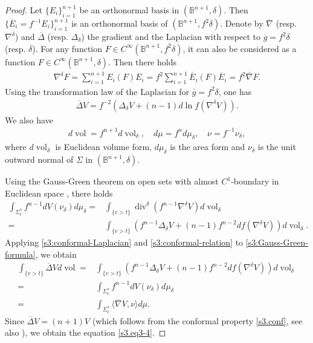 \documentclass[11pt,reqno]{amsart}
\theoremstyle{definition}
\theoremstyle{remark}
\numberwithin{equation}{section}
\renewcommand{\(}{\left(}
\renewcommand{\)}{\right)}
\renewcommand{\~}{\widetilde}
\renewcommand{\-}{\overline}
\renewcommand{\d}{\delta}
\newcommand{\D}{\Delta}
\newcommand{\vol}{\operatorname{vol}}
\newcommand{\divv}{\operatorname{div}}
\begin{document}
\begin{proof}
	Let $\{E_i\}_{i=1}^{n+1}$ be an orthonormal basis in $(\mathbb B^{n+1},\d)$. Then $\{\-E_i=f^{-1}E_i\}_{i=1}^{n+1}$ is an orthonormal basis of $(\mathbb B^{n+1},f^2\d)$. Denote by $\-\nabla$ (resp. $\nabla^\d$) and $\-\D$ (resp. $\D_\d$) the gradient and the Laplacian with respect to $\-g=f^2\d$ (resp. $\d$). For any function $F\in C^\infty(\mathbb B^{n+1},f^2\d)$, it can also be considered as a function $F\in C^\infty(\mathbb B^{n+1},\d)$. Then there holds
	\begin{align*}
	\nabla^\d F=\sum_{i=1}^{n+1}E_i(F)E_i=f^2 \sum_{i=1}^{n+1}\-E_i(F)\-E_i=f^2 \-\nabla F.
	\end{align*}
	Using the transformation law of the Laplacian for $\-g=f^2 \d$, one has
	\begin{align}\label{s3:conformal-Laplacian}
	\-\D V=f^{-2}\(\D_\d V+(n-1)d\ln f(\nabla^\d V)\).
	\end{align}	
	We also have
	\begin{align}\label{s3:conformal-relation}
	d\vol=f^{n+1}d\vol_{\d}, \quad d\mu=f^n d\mu_\d, \quad \nu=f^{-1} \nu_\d,
	\end{align}
	where $d\vol_\d$ is Euclidean volume form, $d\mu_\d$ is the area form and $\nu_\d$ is the unit outward normal of $\Sigma$ in $(\mathbb B^{n+1},\d)$.

Using the Gauss-Green theorem on open sets with almost $C^1$-boundary in Euclidean space \cite[Theorem 9.6]{Maggi2012}, there holds
	\begin{align}\label{s3:Gauss-Green-formula}
	\int_{\Sigma_t^\ast} f^{n-1} dV(\nu_\d) d\mu_\d=&\int_{\{v>t\}} \divv^\d (f^{n-1}\nabla^\d V) d\vol_\d \nonumber\\
	=&\int_{\{v>t\}} \(f^{n-1} \D_\d V+(n-1)f^{n-2} df(\nabla^\d V)\) d\vol_\d.
	\end{align}
Applying \eqref{s3:conformal-Laplacian} and \eqref{s3:conformal-relation} to \eqref{s3:Gauss-Green-formula}, we obtain
	\begin{align*}
	\int_{\{v>t\}}\-\D V d\vol=&\int_{\{v>t\}} \(f^{n-1}\D_\d V+(n-1)f^{n-2}df(\nabla^\d V) \)d\vol_\d\\
	=&\int_{\Sigma_t^\ast} f^{n-1}dV(\nu_\d) d\mu_\d\\
	=&\int_{\Sigma_t^\ast} \langle \-\nabla V,\nu\rangle d\mu.
	\end{align*}
Since $\-\D V=(n+1)V$ (which follows from the conformal property \eqref{s3.conf}, see also \cite{Montiel-Ros1991}), we obtain the equation \eqref{s3.eq3-4}.
\end{proof}
\end{document}

